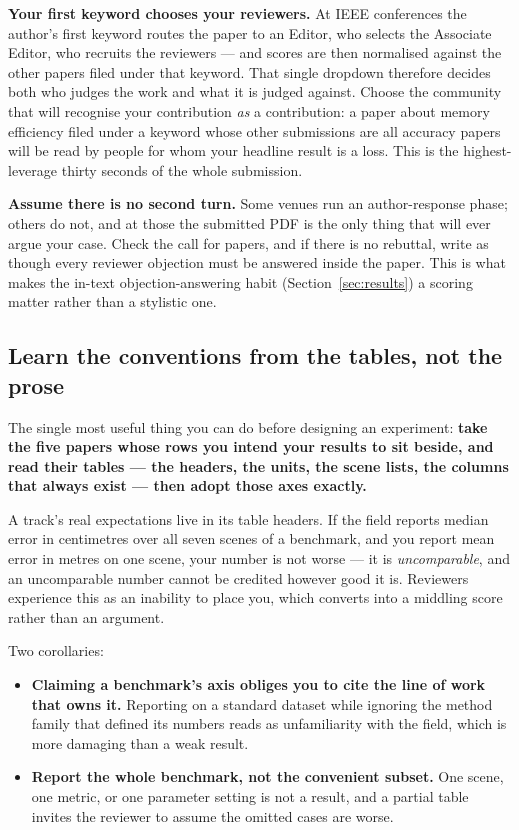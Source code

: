\documentclass[11pt,a4paper]{article}
\newcommand{\lead}[1]{\medskip\noindent\textbf{#1}\quad}
\begin{document}
\lead{Your first keyword chooses your reviewers.} At IEEE conferences the
author's first keyword routes the paper to an Editor, who selects the
Associate Editor, who recruits the reviewers --- and scores are then
normalised against the other papers filed under that keyword. That single
dropdown therefore decides both who judges the work and what it is judged
against. Choose the community that will recognise your contribution
\emph{as} a contribution: a paper about memory efficiency filed under a
keyword whose other submissions are all accuracy papers will be read by
people for whom your headline result is a loss. This is the highest-leverage
thirty seconds of the whole submission.

\lead{Assume there is no second turn.} Some venues run an author-response
phase; others do not, and at those the submitted PDF is the only thing that
will ever argue your case. Check the call for papers, and if there is no
rebuttal, write as though every reviewer objection must be answered inside
the paper. This is what makes the in-text objection-answering habit
(Section~\ref{sec:results}) a scoring matter rather than a stylistic one.

\subsection*{Learn the conventions from the tables, not the prose}

The single most useful thing you can do before designing an experiment:
\textbf{take the five papers whose rows you intend your results to sit
beside, and read their tables --- the headers, the units, the scene lists,
the columns that always exist --- then adopt those axes exactly.}

A track's real expectations live in its table headers. If the field reports
median error in centimetres over all seven scenes of a benchmark, and you
report mean error in metres on one scene, your number is not worse --- it is
\emph{uncomparable}, and an uncomparable number cannot be credited however
good it is. Reviewers experience this as an inability to place you, which
converts into a middling score rather than an argument.

Two corollaries:

\begin{itemize}
  \item \textbf{Claiming a benchmark's axis obliges you to cite the line of
    work that owns it.} Reporting on a standard dataset while ignoring the
    method family that defined its numbers reads as unfamiliarity with the
    field, which is more damaging than a weak result.
  \item \textbf{Report the whole benchmark, not the convenient subset.} One
    scene, one metric, or one parameter setting is not a result, and a
    partial table invites the reviewer to assume the omitted cases are worse.
\end{itemize}
\end{document}
